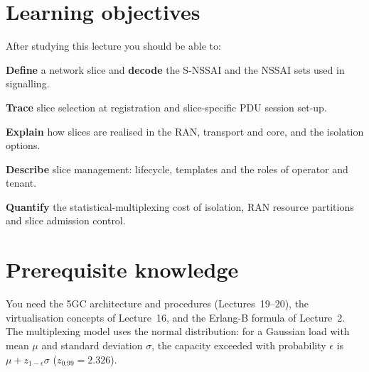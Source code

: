 \documentclass[11pt,a4paper]{article}
\begin{document}
\ACNcover

\section{Learning objectives}
After studying this lecture you should be able to:
\begin{objectives}
  \item \textbf{Define} a network slice and \textbf{decode} the S-NSSAI and the NSSAI sets used in signalling.
  \item \textbf{Trace} slice selection at registration and slice-specific PDU session set-up.
  \item \textbf{Explain} how slices are realised in the RAN, transport and core, and the isolation options.
  \item \textbf{Describe} slice management: lifecycle, templates and the roles of operator and tenant.
  \item \textbf{Quantify} the statistical-multiplexing cost of isolation, RAN resource partitions and slice
        admission control.
\end{objectives}

\section{Prerequisite knowledge}
You need the 5GC architecture and procedures (Lectures~19--20), the virtualisation concepts of Lecture~16, and the Erlang-B formula
of Lecture~2. The multiplexing model uses the normal distribution: for a Gaussian load with mean $\mu$ and standard deviation $\sigma$,
the capacity exceeded with probability $\epsilon$ is $\mu + z_{1-\epsilon}\sigma$ ($z_{0.99} = 2.326$).
\end{document}
